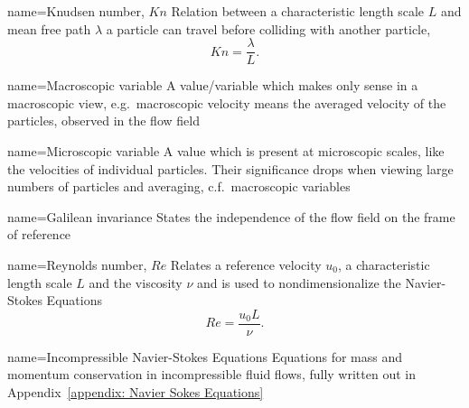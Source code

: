 
{
name={Knudsen number, $Kn$}
}
{Relation between a characteristic length scale $L$ and mean free path $\lambda$ a particle can travel before colliding with another particle,
\begin{equation}
  \label{eq: definition of knudsen number}
  Kn=\frac{\lambda}{L}.
\end{equation}}

{
name={Macroscopic variable}
}
{A value/variable which makes only sense in a macroscopic view, e.g.\ macroscopic velocity means the averaged velocity of the particles, observed in the flow field
}

{
name={Microscopic variable}
}
{
A value which is present at microscopic scales, like the velocities of individual particles. Their significance drops when viewing large numbers of particles and averaging, c.f.\ macroscopic variables
}

{
name={Galilean invariance}
}{States the independence of the flow field on the frame of reference}

{
name={Reynolds number, $Re$}
}
{Relates a reference velocity $u_0$, a characteristic length scale $L$ and the viscosity $\nu$ and is used to nondimensionalize the Navier-Stokes Equations
\begin{equation}
  \label{eq: definition of reynolds number}
  Re=\frac{u_0 L}{\nu}.
\end{equation}}

{
name={Incompressible Navier-Stokes Equations}
}
{Equations for mass and momentum conservation in incompressible fluid flows, fully written out in Appendix~\ref{appendix: Navier Sokes Equations}
}
